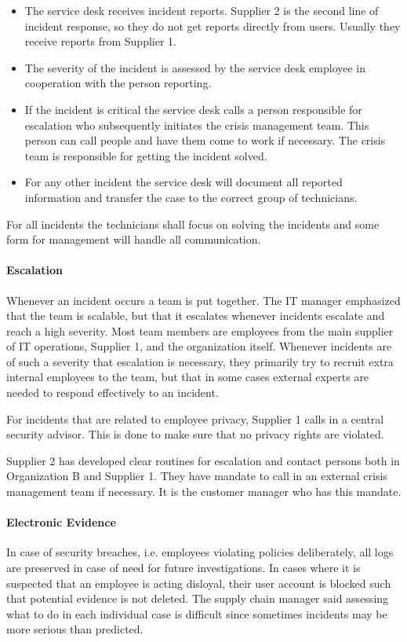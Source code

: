 \begin{itemize}
\item The service desk receives incident reports. Supplier 2 is the second line of incident response, so they do not get reports directly from users. Usually they receive reports from Supplier 1.
\item The severity of the incident is assessed by the service desk employee in cooperation with the person reporting.
\item If the incident is critical the service desk calls a person responsible for escalation who subsequently initiates the crisis management team. This person can call people and have them come to work if necessary. The crisis team is responsible for getting the incident solved.
\item For any other incident the service desk will document all reported information and transfer the case to the correct group of technicians.
\end{itemize}

For all incidents the technicians shall focus on solving the incidents and some form for management will handle all communication. 

\paragraph{Escalation}
Whenever an incident occurs a team is put together. The IT manager emphasized that the team is scalable, but that it escalates whenever incidents escalate and reach a high severity. Most team members are employees from the main supplier of IT operations, Supplier 1, and the organization itself. Whenever incidents are of such a severity that escalation is necessary, they primarily try to recruit extra internal employees to the team, but that in some cases external experts are needed to respond effectively to an incident.

For incidents that are related to employee privacy, Supplier 1 calls in a central security advisor. This is done to make sure that no privacy rights are violated.

Supplier 2 has developed clear routines for escalation and contact persons both in Organization B and Supplier 1. They have mandate to call in an external crisis management team if necessary. It is the customer manager who has this mandate. 

\paragraph{Electronic Evidence}
In case of security breaches, i.e. employees violating policies deliberately, all logs are preserved in case of need for future investigations. In cases where it is suspected that an employee is acting disloyal, their user account is blocked such that potential evidence is not deleted. The supply chain manager said assessing what to do in each individual case is difficult since sometimes incidents may be more serious than predicted. 

